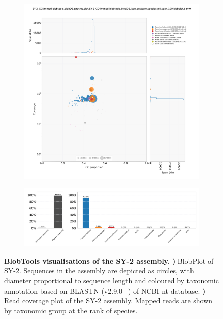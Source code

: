 \begin{figure}[hp!]
    \centering
    \begin{subfigure}[]{0.99\textwidth}
        \centering
        \includegraphics[width=\textwidth]{Appendices/SY-2_GCtimmed.blobtools.blobDB.species.plot.SY-2_GCtimmed.blobtools.blobDB.json.bestsum.species.p8.span.100.blobplot.bam0.png}
        \caption{}
        \label{fig:BlobPlot-SY-2}
    \end{subfigure}
    \begin{subfigure}[]{0.9\textwidth}
        \centering
        \includegraphics[width=\textwidth]{Appendices/SY-2_GCtimmed.blobtools.blobDB.species.plot.SY-2_GCtimmed.blobtools.blobDB.json.bestsum.species.p8.span.100.blobplot.read_cov.bam0.png}
        \caption{}
        \label{fig:BlobPlot_readcov-SY-2}
    \end{subfigure}
    \caption[BlobTools visualisations of the SY-2 assembly]{\textbf{BlobTools visualisations of the SY-2 assembly.}
        \textbf{)} BlobPlot of SY-2. Sequences in the assembly are depicted as circles, with diameter proportional to sequence length and coloured by taxonomic annotation based on BLASTN (v2.9.0+) of NCBI nt database.
        \textbf{)} Read coverage plot of the SY-2 assembly. Mapped reads are shown by taxonomic group at the rank of species.}
        \label{fig:SY-2:BlobTools}
\end{figure}

